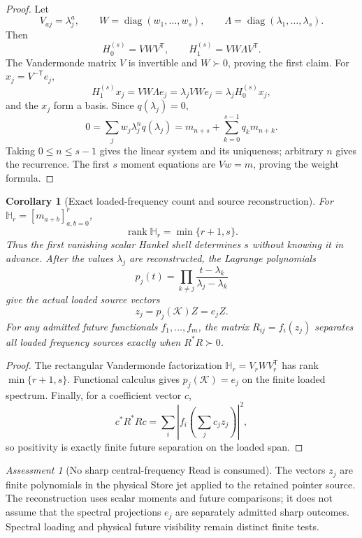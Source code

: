 \documentclass[11pt]{article}
\newtheorem{corollary}[theorem]{Corollary}
\theoremstyle{definition}
\theoremstyle{remark}
\newtheorem{assessment}[theorem]{Assessment}
\newcommand{\rank}{\operatorname{rank}}
\newcommand{\diag}{\operatorname{diag}}
\begin{document}
\begin{proof}
Let
\[
  V_{aj}=\lambda_j^a,
  \qquad
  W=\diag(w_1,\ldots,w_s),
  \qquad
  \Lambda=\diag(\lambda_1,\ldots,\lambda_s).
\]
Then
\[
  H_0^{(s)}=VWV^{\mathsf T},
  \qquad
  H_1^{(s)}=VW\Lambda V^{\mathsf T}.
\]
The Vandermonde matrix $V$ is invertible and $W\succ0$, proving the first
claim.  For $x_j=V^{-\mathsf T}e_j$,
\[
  H_1^{(s)}x_j=VW\Lambda e_j
  =\lambda_jVWe_j=\lambda_jH_0^{(s)}x_j,
\]
and the $x_j$ form a basis.  Since $q(\lambda_j)=0$,
\[
  0=\sum_jw_j\lambda_j^nq(\lambda_j)
   =m_{n+s}+\sum_{k=0}^{s-1}q_km_{n+k}.
\]
Taking $0\le n\le s-1$ gives the linear system and its uniqueness; arbitrary
$n$ gives the recurrence.  The first $s$ moment equations are $Vw=m$, proving
the weight formula.
\end{proof}

\begin{corollary}[Exact loaded-frequency count and source reconstruction]
\label{cor:store-frequency-count-master}
For $\mathbb H_r=[m_{a+b}]_{a,b=0}^{r}$,
\begin{equation}
  \boxed{\rank\mathbb H_r=\min\{r+1,s\}.}
  \label{eq:store-Hankel-rank-master}
\end{equation}
Thus the first vanishing scalar Hankel shell determines $s$ without knowing it
in advance.  After the values $\lambda_j$ are reconstructed, the Lagrange
polynomials
\[
  p_j(t)=\prod_{k\ne j}\frac{t-\lambda_k}{\lambda_j-\lambda_k}
\]
give the actual loaded source vectors
\begin{equation}
  \boxed{z_j=p_j(\mathscr K)Z=e_jZ.}
  \label{eq:store-source-reconstruction-master}
\end{equation}
For any admitted future functionals $f_1,\ldots,f_m$, the matrix
$R_{ij}=f_i(z_j)$ separates all loaded frequency sources exactly when
$R^*R\succ0$.
\end{corollary}

\begin{proof}
The rectangular Vandermonde factorization
$\mathbb H_r=V_rWV_r^{\mathsf T}$ has rank $\min\{r+1,s\}$.  Functional
calculus gives $p_j(\mathscr K)=e_j$ on the finite loaded spectrum.  Finally,
for a coefficient vector $c$,
\[
  c^*R^*Rc
  =\sum_i\left|f_i\left(\sum_jc_jz_j\right)\right|^2,
\]
so positivity is exactly finite future separation on the loaded span.
\end{proof}

\begin{assessment}[No sharp central-frequency Read is consumed]
\label{assess:store-no-PVM-master}
The vectors $z_j$ are finite polynomials in the physical Store jet applied to
the retained pointer source.  The reconstruction uses scalar moments and
future comparisons; it does not assume that the spectral projections $e_j$
are separately admitted sharp outcomes.  Spectral loading and physical future
visibility remain distinct finite tests.
\end{assessment}
\end{document}
